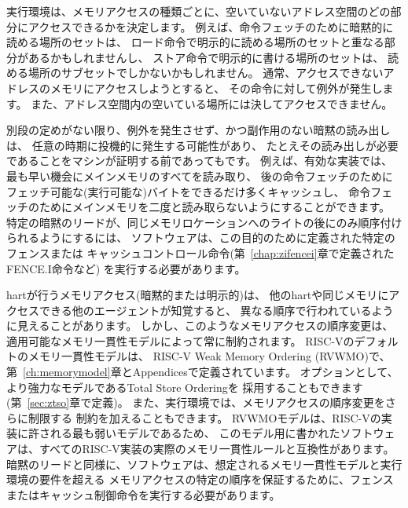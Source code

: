 実行環境は、メモリアクセスの種類ごとに、空いていないアドレス空間のどの部分にアクセスできるかを決定します。
例えば、命令フェッチのために暗黙的に読める場所のセットは、
ロード命令で明示的に読める場所のセットと重なる部分があるかもしれませんし、
ストア命令で明示的に書ける場所のセットは、
読める場所のサブセットでしかないかもしれません。
通常、アクセスできないアドレスのメモリにアクセスしようとすると、
その命令に対して例外が発生します。
また、アドレス空間内の空いている場所には決してアクセスできません。

別段の定めがない限り、例外を発生させず、かつ副作用のない暗黙の読み出しは、
任意の時期に投機的に発生する可能性があり、
たとえその読み出しが必要であることをマシンが証明する前であってもです。 例えば、有効な実装では、最も早い機会にメインメモリのすべてを読み取り、
後の命令フェッチのためにフェッチ可能な(実行可能な)バイトをできるだけ多くキャッシュし、
命令フェッチのためにメインメモリを二度と読み取らないようにすることができます。 特定の暗黙のリードが、同じメモリロケーションへのライトの後にのみ順序付けられるようにするには、
ソフトウェアは、この目的のために定義された特定のフェンスまたは
キャッシュコントロール命令(第~\ref{chap:zifencei}章で定義されたFENCE.I命令など)
を実行する必要があります。

hartが行うメモリアクセス(暗黙的または明示的)は、
他のhartや同じメモリにアクセスできる他のエージェントが知覚すると、
異なる順序で行われているように見えることがあります。
しかし、このようなメモリアクセスの順序変更は、適用可能なメモリ一貫性モデルによって常に制約されます。
RISC-Vのデフォルトのメモリ一貫性モデルは、
RISC-V Weak Memory Ordering (RVWMO)で、第~\ref{ch:memorymodel}章とAppendicesで定義されています。
オプションとして、より強力なモデルであるTotal Store Orderingを
採用することもできます(第~\ref{sec:ztso}章で定義)。 
また、実行環境では、メモリアクセスの順序変更をさらに制限する
制約を加えることもできます。
RVWMOモデルは、RISC-Vの実装に許される最も弱いモデルであるため、
このモデル用に書かれたソフトウェアは、すべてのRISC-V実装の実際のメモリ一貫性ルールと互換性があります。
暗黙のリードと同様に、ソフトウェアは、想定されるメモリ一貫性モデルと実行環境の要件を超える
メモリアクセスの特定の順序を保証するために、フェンスまたはキャッシュ制御命令を実行する必要があります。

